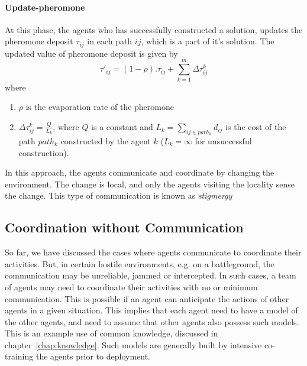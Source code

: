 \paragraph{Update-pheromone}
At this phase, the agents who has successfully constructed a solution, updates the pheromone deposit $\tau_{ij}$ in each path 
$ij$, which is a part of it's solution. The updated value of pheromone deposit is given by
\begin{equation}
	\tau'_{ij} = (1 - \rho).\tau_{ij} + \sum_{k=1}^m \Delta\tau_{ij}^k
\end{equation}
\noindent
where
\begin{enumerate}
	\item $\rho$ is the evaporation rate of the pheromone
	\item $\Delta \tau_{ij}^k = \frac{Q}{L_k}$, where $Q$ is a constant and $L_k = \sum_{ij \in path_k} d_{ij}$ is the cost 
	of the path $path_k$ constructed by the agent $k$ ($L_k = \infty$ for unsuccessful construction).
\end{enumerate}

In this approach, the agents communicate and coordinate by changing the environment. The change is local, and only the
agents visiting the locality sense the change. This type of communication is known as {\em stigmergy}~\citep{Heylighen:2016} 

\subsection{Coordination without Communication}

So far, we have discussed the cases where agents communicate to coordinate their activities. But, in certain hostile environments,
e.g. on a battleground, the communication may be unreliable, jammed or intercepted. In such cases, a team of agents may need to
coordinate their activities with no or minimum communication. This is possible if an agent can anticipate the actions of other
agents in a given situation. This implies that each agent need to have a model of the other agents, and need to assume that 
other agents also possess such models. This is an example use of common knowledge, discussed in chapter~\ref{chap:knowledge}. 
Such models are generally built by intensive co-training the agents prior to deployment. 


